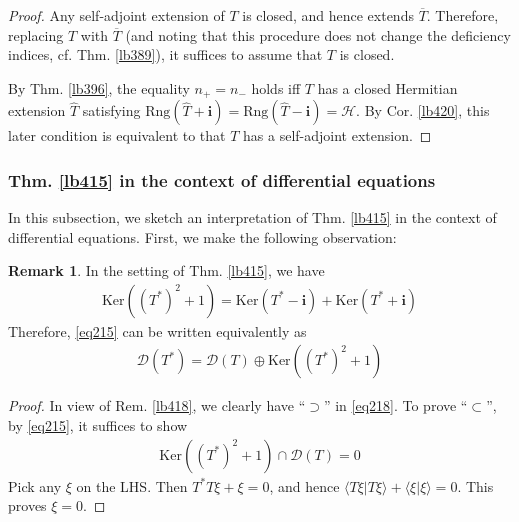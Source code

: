 \documentclass[12pt,b5paper,notitlepage]{article}
\theoremstyle{definition}
\newtheorem{rem}[df]{Remark}
\theoremstyle{plain}
\newcommand{\wht}{\widehat}
\newcommand{\ovl}{\overline}
\newcommand{\Dom}{\mathscr{D}}
\newcommand{\bk}[1]{\langle {#1}\rangle}
\newcommand{\im}{\mathbf{i}}
\newcommand{\Ker}{\mathrm{Ker}}
\newcommand{\Rng}{\mathrm{Rng}}
\newcommand{\MH}{\mathcal H}
\numberwithin{equation}{section}
\begin{document}
\begin{proof}
Any self-adjoint extension of $T$ is closed, and hence extends $\ovl T$. Therefore, replacing $T$ with $\ovl T$ (and noting that this procedure does not change the deficiency indices, cf. Thm. \ref{lb389}), it suffices to assume that $T$ is closed.

By Thm. \ref{lb396}, the equality $n_+=n_-$ holds iff $T$ has a closed Hermitian extension $\wht T$ satisfying $\Rng(\wht T+\im)=\Rng(\wht T-\im)=\MH$. By Cor. \ref{lb420}, this later condition is equivalent to that $T$ has a self-adjoint extension.
\end{proof}







\subsubsection{Thm. \ref{lb415} in the context of differential equations}

In this subsection, we sketch an interpretation of Thm. \ref{lb415} in the context of differential equations. First, we make the following observation:
\begin{rem}\label{lb419}
In the setting of Thm. \ref{lb415}, we have
\begin{align}\label{eq218}
\Ker((T^*)^2+1)=\Ker(T^*-\im)+\Ker(T^*+\im)
\end{align}
Therefore, \eqref{eq215} can be written equivalently as
\begin{align}
\Dom(T^*)=\Dom(T)\oplus \Ker((T^*)^2+1)
\end{align}
\end{rem}

\begin{proof}
In view of Rem. \ref{lb418}, we clearly have ``$\supset$'' in \eqref{eq218}. To prove ``$\subset$'', by \eqref{eq215}, it suffices to show
\begin{align*}
\Ker((T^*)^2+1)\cap\Dom(T)=0
\end{align*}
Pick any $\xi$ on the LHS. Then $T^*T\xi+\xi=0$, and hence $\bk{T\xi|T\xi}+\bk{\xi|\xi}=0$. This proves $\xi=0$.
\end{proof}
\end{document}
